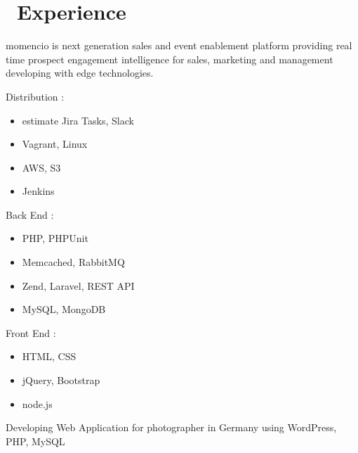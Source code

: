\documentclass{resume}
\begin{document}



\section{\faUsers\ Experience}
momencio is next generation sales and event enablement platform providing real time prospect engagement intelligence for sales, marketing and management developing with edge technologies.
\begin{multicols}{3}
Distribution :
\begin{itemize}
  \item estimate Jira Tasks, Slack
  \item Vagrant, Linux
  \item AWS, S3
  \item Jenkins
\end{itemize}

\columnbreak

Back End :
\begin{itemize}
  \item PHP, PHPUnit
  \item Memcached, RabbitMQ
  \item Zend, Laravel, REST API
  \item MySQL, MongoDB
\end{itemize}

\columnbreak

Front End :
\begin{itemize}
  \item HTML, CSS
  \item jQuery, Bootstrap
  \item node.js
\end{itemize}
\end{multicols}

Developing Web Application for photographer in Germany using WordPress, PHP, MySQL
\end{document}

